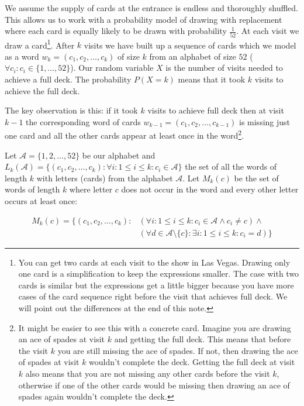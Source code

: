 We assume the supply of cards at the entrance is endless and thoroughly shuffled. This allows us to work with a probability model of drawing with replacement where each card is equally likely to be drawn with probability $\frac{1}{52}$. At each visit we draw a card\footnote{You can get two cards at each visit to the show in Las Vegas. Drawing only one card is a simplification to keep the expressions smaller. The case with two cards is similar but the expressions get a little bigger because you have more cases of the card sequence right before the visit that achieves full deck. We will point out the differences at the end of this note.}.
After $k$ visits we have built up a sequence of cards which we model as a word $w_k=(c_1, c_2, \ldots, c_k)$ of size $k$ from an alphabet of size $52$ ($\forall c_i: c_i \in \{1, \ldots, 52\}$). Our random variable $X$ is the number of visits needed to achieve a full deck. The probability $P(X=k)$ means that it took $k$ visits to achieve the full deck. 

The key observation is this: if it took $k$ visits to achieve full deck then at visit $k-1$ the corresponding word of cards $w_{k-1}=(c_1, c_2, \ldots, c_{k-1})$ is missing just one card and all the other cards appear at least once in the word\footnote{It might be easier to see this with a concrete card. Imagine you are drawing an ace of spades at visit $k$ and getting the full deck. This means that before the visit $k$ you are still missing the ace of spades. If not, then drawing the ace of spades at visit $k$ wouldn't complete the deck. Getting the full deck at visit $k$ also means that you are not missing any other cards before the visit $k$, otherwise if one of the other cards would be missing then drawing an ace of spades again wouldn't complete the deck.}.

Let $\mathcal{A} = \{1, 2, \ldots, 52\}$ be our alphabet and $L_k(\mathcal{A}) = \{(c_1, c_2, \ldots, c_k): \forall i: 1 \leq i \leq k: c_i \in \mathcal{A}\}$ the set of all the words of length $k$ with letters (cards) from the alphabet $\mathcal{A}$. Let $M_k(c)$ be the set of words of length $k$ where letter $c$ does not occur in the word and every other letter occurs at least once:

\begin{align*}
M_k(c) = \{(c_1, c_2, \ldots, c_k): &(\forall i: 1 \leq i \leq k: c_i \in \mathcal{A} \wedge c_i \neq c) \wedge \\
& (\forall d \in \mathcal{A} \setminus \{c\}: \exists i: 1 \leq i \leq k: c_i = d)\}
\end{align*}

